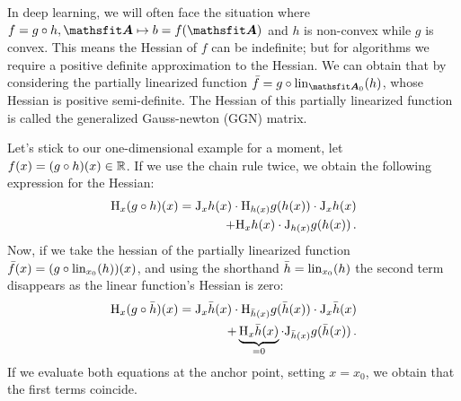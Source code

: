 In deep learning, we will often face the situation where $f = g \circ h, \tA \mapsto b = f(\tA)$ and $h$ is non-convex while $g$ is convex.
This means the Hessian of $f$ can be indefinite; but for algorithms we require a positive definite approximation to the Hessian.
We can obtain that by considering the partially linearized function $\bar{f} = g \circ \lin_{\tA_0}(h)$, whose Hessian is positive semi-definite. The Hessian of this partially linearized function is called the generalized Gauss-newton (GGN) matrix.

Let's stick to our one-dimensional example for a moment, \ie let $f(x) = (g \circ h)(x) \in {\mathbb{R}}$. If we use the chain rule twice, we obtain the following expression for the Hessian:
\begin{align*}
  \mathrm{H}_x (g \circ h)(x) =
  \mathrm{J}_x h(x) \cdot \mathrm{H}_{h(x)} g(h(x)) \cdot \mathrm{J}_x h(x)
  \\
  +
  \mathrm{H}_x h(x) \cdot \mathrm{J}_{h(x)} g(h(x))\,.
\end{align*}
Now, if we take the hessian of the partially linearized function $\bar{f}(x) = (g \circ \operatorname{lin}_{x_0}(h))(x)$, and using the shorthand $\bar{h} = \operatorname{lin}_{x_0}(h)$ the second term disappears as the linear function's Hessian is zero:
\begin{align*}
  \mathrm{H}_x (g \circ \bar{h})(x) =
  \mathrm{J}_x \bar{h}(x) \cdot \mathrm{H}_{\bar{h}(x)} g(\bar{h}(x)) \cdot \mathrm{J}_x \bar{h}(x)
  \\
  +
  \underbrace{\mathrm{H}_x \bar{h}(x)}_{= 0} \cdot \mathrm{J}_{\bar{h}(x)} g(\bar{h}(x))\,.
\end{align*}
If we evaluate both equations at the anchor point, setting $x = x_0$, we obtain that the first terms coincide.

